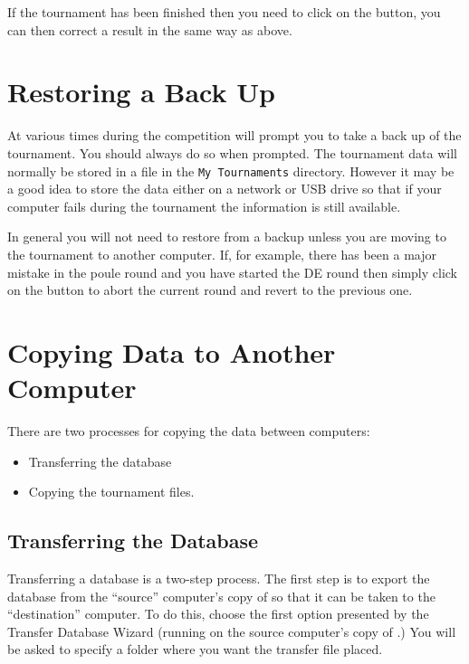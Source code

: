 \documentclass[a4paper,11pt]{memoir}
\begin{document}
If the tournament has been finished then you need to click on the  button, you can then correct a result in the same way as above.

\section{Restoring a Back Up}

At various times during the \gls{competition} \fencingtime{} will prompt you to take a back up of the tournament. You should always do so when prompted. The tournament data will normally be stored in a file in the \texttt{My Tournaments} directory. However it may be a good idea to store the data either on a network or USB drive so that if your computer fails during the tournament the information is still available.

In general you will not need to restore from a backup unless you are moving to the tournament to another computer. If, for example, there has been a major mistake in the poule round and you have started the DE round then simply click on the  button to abort the current round and revert to the previous one.

\section{Copying Data to Another Computer}

There are two processes for copying the data between computers:

\begin{itemize}
 \item Transferring the database
 \item Copying the tournament files.
\end{itemize}

\subsection{Transferring the Database}

Transferring a database is a two-step process. The first step is to export the \gls{database} from the “source” computer’s copy of \fencingtime{} so that it can be taken to the “destination” computer. To do this, choose the first option presented by the Transfer Database Wizard (running on the source computer’s copy of \fencingtime{}.) You will be asked to specify a folder where you want the transfer file placed.
\end{document}
